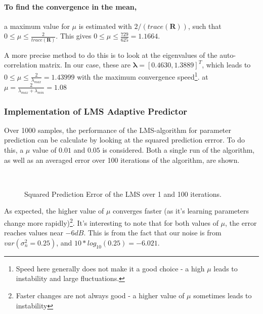 \documentclass[main.tex]{subfiles}
\begin{document}
\paragraph{To find the convergence in the mean,} a maximum value for $\mu$ is estimated with $2/(trace(\textbf{R}))$, such that $0 \leq \mu \leq \frac{2}{trace(\textbf{R})}$. This gives $0 \leq \mu \leq \frac{729}{625} = 1.1664$.

A more precise method to do this is to look at the eigenvalues of the auto-correlation matrix. In our case, these are $\mathbf{ \lambda } = [0.4630, 1.3889] ^ T $, which leads to $0 \leq \mu \leq \frac{2}{\lambda_{max}} = 1.43999$ with the maximum convergence speed\footnote{Speed here generally does not make it a good choice - a high $\mu$ leads to instability and large fluctuations.}.  at $\mu = \frac{2}{\lambda_{max} + \lambda_{min}} = 1.08$






\subsubsection{Implementation of LMS Adaptive Predictor}

Over 1000 samples, the performance of the LMS-algorithm for parameter prediction can be calculate by looking at the squared prediction errror. To do this, a $\mu$ value of $0.01$ and $0.05$ is considered. Both a single run of the algorithm, as well as an averaged error over 100 iterations of the algorithm, are shown.


\begin{figure}[H]
	\centering
	\begin{subfigure}[b]{0.45\textwidth}
		\resizebox{\textwidth}{!}{}
	\end{subfigure}%
	~ %
	\begin{subfigure}[b]{0.45\textwidth}
		\resizebox{\textwidth}{!}{}
	\end{subfigure}
	\caption{Squared Prediction Error of the LMS over 1 and 100 iterations.}
	\label{fig:animals}
\end{figure}



As expected, the higher value of $\mu$ converges faster (as it's learning parameters change more rapidly)\footnote{Faster changes are not always good - a higher value of $\mu$ sometimes leads to instability}. It's interesting to note that for both values of $\mu$, the error reaches values near $-6dB$. This is from the fact that our noise is from $var(\sigma_n^2 = 0.25)$, and $10*log_{10}(0.25) = -6.021$.
\end{document}
